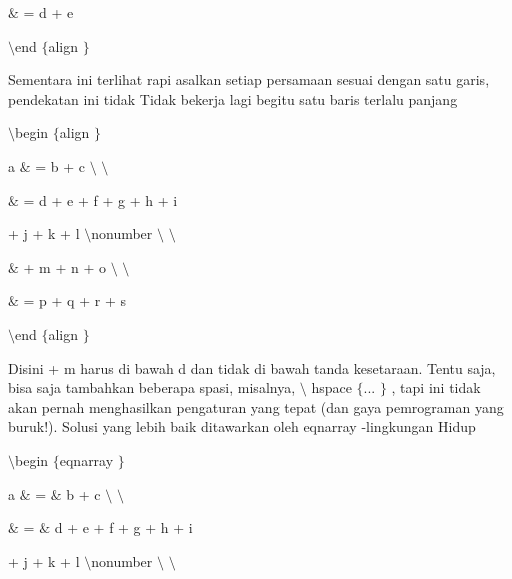 \begin{itemize}
\vspace{12pt}
\noindent 
 $  \&  $ = d + e \par
\vspace{12pt}
\noindent 
 $  \setminus  $end $  \{  $align $  \}  $ \par
\vspace{12pt}
\noindent 
Sementara ini terlihat rapi asalkan setiap persamaan sesuai dengan satu garis, pendekatan ini tidak Tidak bekerja lagi begitu satu baris terlalu panjang \par
\noindent 
 $  \setminus  $begin $  \{  $align $  \}  $ \par
\vspace{12pt}
\noindent 
a  $  \&  $ = b + c  $  \setminus  $ $  \setminus  $ \par
\vspace{12pt}
\noindent 
 $  \&  $ = d + e + f + g + h + i \par
\noindent 
  \par
\noindent 
+ j + k + l  $  \setminus  $nonumber $  \setminus  $ $  \setminus  $ \par
\vspace{12pt}
\noindent 
 $  \&  $ + m + n + o  $  \setminus  $ $  \setminus  $ \par
\vspace{12pt}
\noindent 
 $  \&  $ = p + q + r + s \par
\vspace{12pt}
\noindent 
 $  \setminus  $end $  \{  $align $  \}  $ \par
\vspace{12pt}
\noindent 
Disini + m harus di bawah d dan tidak di bawah tanda kesetaraan. Tentu saja, bisa saja tambahkan beberapa spasi, misalnya,  $  \setminus  $ hspace  $  \{  $... $  \}  $ , tapi ini tidak akan pernah menghasilkan pengaturan yang tepat (dan gaya pemrograman yang buruk!). Solusi yang lebih baik ditawarkan oleh eqnarray -lingkungan Hidup \par
\vspace{12pt}
\noindent 
 $  \setminus  $begin $  \{  $eqnarray $  \}  $ \par
\vspace{12pt}
\noindent 
a  $  \&  $ =  $  \&  $ b + c  $  \setminus  $ $  \setminus  $ \par
\vspace{12pt}
\noindent 
 $  \&  $ =  $  \&  $ d + e + f + g + h + i \par
\vspace{12pt}
\noindent 
+ j + k + l  $  \setminus  $nonumber $  \setminus  $ $  \setminus  $ \par

\end{itemize}
